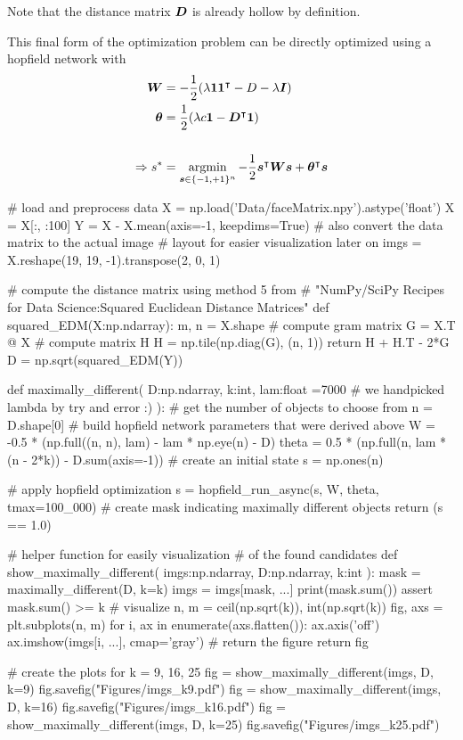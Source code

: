 Note that the distance matrix $\bm{D}$ is already hollow by definition.

This final form of the optimization problem can be directly optimized using a hopfield network with
\begin{align*}
    \bm{W} &= -\frac12(\lambda \bm{1}\bm{1}^\intercal - D - \lambda \bm{I}) \\
    \bm{\theta} &= \frac12(\lambda c \bm{1} - \bm{D}^\intercal \bm{1}) \\
    \\
    \Rightarrow s^* &= \operatorname*{argmin}_{\bm{s} \in \{ -1, +1 \}^n} -\frac12 \bm{s}^\intercal\bm{W}\bm{s} + \bm{\theta}^\intercal\bm{s}
\end{align*}

\color{black}
\begin{python}
# load and preprocess data
X = np.load('Data/faceMatrix.npy').astype('float')
X = X[:, :100]
Y = X - X.mean(axis=-1, keepdims=True)
# also convert the data matrix to the actual image
# layout for easier visualization later on
imgs = X.reshape(19, 19, -1).transpose(2, 0, 1)

# compute the distance matrix using method 5 from
# "NumPy/SciPy Recipes for Data Science:Squared Euclidean Distance Matrices"
def squared_EDM(X:np.ndarray):
    m, n = X.shape
    # compute gram matrix
    G = X.T @ X
    # compute matrix H
    H = np.tile(np.diag(G), (n, 1))
    return H + H.T - 2*G
D = np.sqrt(squared_EDM(Y))

def maximally_different(
    D:np.ndarray, 
    k:int, 
    lam:float =7000     # we handpicked lambda by try and error :)
):
    # get the number of objects to choose from
    n = D.shape[0]
    # build hopfield network parameters that were derived above
    W = -0.5 * (np.full((n, n), lam) - lam * np.eye(n) - D)
    theta = 0.5 * (np.full(n, lam * (n - 2*k)) - D.sum(axis=-1))
    # create an initial state
    s = np.ones(n)
    
    # apply hopfield optimization
    s = hopfield_run_async(s, W, theta, tmax=100_000)
    # create mask indicating maximally different objects
    return (s == 1.0)

# helper function for easily visualization
# of the found candidates
def show_maximally_different(
    imgs:np.ndarray, 
    D:np.ndarray, 
    k:int
):
    mask = maximally_different(D, k=k)
    imgs = imgs[mask, ...]
    print(mask.sum())
    assert mask.sum() >= k
    # visualize
    n, m = ceil(np.sqrt(k)), int(np.sqrt(k))
    fig, axs = plt.subplots(n, m)
    for i, ax in enumerate(axs.flatten()):
        ax.axis('off')
        ax.imshow(imgs[i, ...], cmap='gray')
    # return the figure
    return fig
    
# create the plots for k = 9, 16, 25
fig = show_maximally_different(imgs, D, k=9)
fig.savefig("Figures/imgs_k9.pdf")
fig = show_maximally_different(imgs, D, k=16)
fig.savefig("Figures/imgs_k16.pdf")
fig = show_maximally_different(imgs, D, k=25)
fig.savefig("Figures/imgs_k25.pdf")

\end{python}

